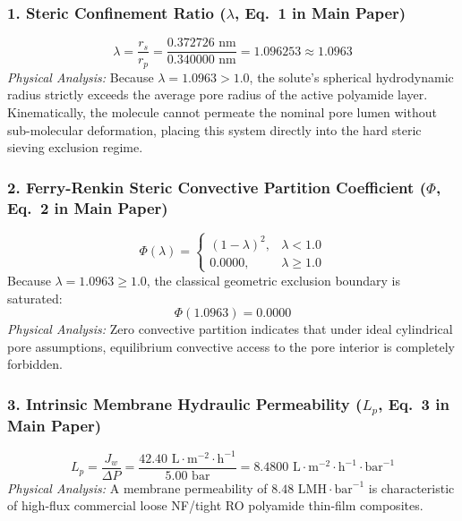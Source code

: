 \documentclass[11pt]{article}
\begin{document}
\subsubsection{1. Steric Confinement Ratio ($\lambda$, Eq.~1 in Main Paper)}
\begin{equation}
\lambda = \frac{r_s}{r_p} = \frac{0.372726\text{ nm}}{0.340000\text{ nm}} = 1.096253 \approx 1.0963
\end{equation}
\noindent\textit{Physical Analysis:} Because $\lambda = 1.0963 > 1.0$, the solute's spherical hydrodynamic radius strictly exceeds the average pore radius of the active polyamide layer. Kinematically, the molecule cannot permeate the nominal pore lumen without sub-molecular deformation, placing this system directly into the hard steric sieving exclusion regime.

\subsubsection{2. Ferry-Renkin Steric Convective Partition Coefficient ($\Phi$, Eq.~2 in Main Paper)}
\begin{equation}
\Phi(\lambda) = \begin{cases}
(1 - \lambda)^2, & \lambda < 1.0 \\
0.0000, & \lambda \ge 1.0
\end{cases}
\end{equation}
Because $\lambda = 1.0963 \ge 1.0$, the classical geometric exclusion boundary is saturated:
\begin{equation}
\Phi(1.0963) = 0.0000
\end{equation}
\noindent\textit{Physical Analysis:} Zero convective partition indicates that under ideal cylindrical pore assumptions, equilibrium convective access to the pore interior is completely forbidden.

\subsubsection{3. Intrinsic Membrane Hydraulic Permeability ($L_p$, Eq.~3 in Main Paper)}
\begin{equation}
L_p = \frac{J_w}{\Delta P} = \frac{42.40\text{ L}\cdot\text{m}^{-2}\cdot\text{h}^{-1}}{5.00\text{ bar}} = 8.4800\text{ L}\cdot\text{m}^{-2}\cdot\text{h}^{-1}\cdot\text{bar}^{-1}
\end{equation}
\noindent\textit{Physical Analysis:} A membrane permeability of $8.48\text{ LMH}\cdot\text{bar}^{-1}$ is characteristic of high-flux commercial loose NF/tight RO polyamide thin-film composites.
\end{document}
